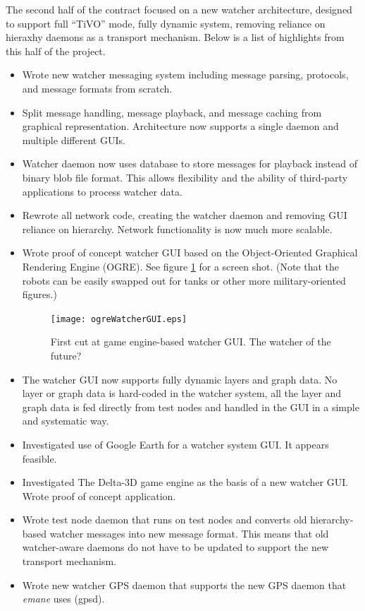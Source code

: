 \documentclass{report}
\begin{document}
The second half of the contract focused on a new watcher architecture, designed to support full ``TiVO'' mode, fully dynamic system, removing reliance
on hieraxhy daemons as a transport mechanism. Below is a list of highlights from this half of the project.

\begin{itemize}
\item Wrote new watcher messaging system including message parsing, protocols, and message formats from scratch. 
\item Split message handling, message playback, and message caching from graphical representation. Architecture now
supports a single daemon and multiple different GUIs. 
\item Watcher daemon now uses database to store messages for playback instead of binary blob file format. This allows
flexibility and the ability of third-party applications to process watcher data. 
\item Rewrote all network code, creating the watcher daemon and removing GUI reliance on hierarchy. Network functionality is now
much more scalable. 
\item Wrote proof of concept watcher GUI based on the Object-Oriented Graphical Rendering Engine (OGRE). See figure \ref{fig:ogreWatcherGUI} for a 
screen shot. (Note that the robots can be easily swapped out for tanks or other more military-oriented figures.) 

\begin{figure}[htb]
\centering
\texttt{[image: ogreWatcherGUI.eps]}
\caption{First cut at game engine-based watcher GUI. The watcher of the future?}
\label{fig:ogreWatcherGUI}
\end{figure}

\item The watcher GUI now supports fully dynamic layers and graph data. No layer or graph data is hard-coded in the watcher system, all 
the layer and graph data is fed directly from test nodes and handled in the GUI in a simple and systematic way.
\item Investigated use of Google Earth for a watcher system GUI. It appears feasible. 
\item Investigated The Delta-3D game engine as the basis of a new watcher GUI. Wrote proof of concept application. 
\item Wrote test node daemon that runs on test nodes and converts old hierarchy-based watcher messages into new message format. 
This means that old watcher-aware daemons do not have to be updated to support the new transport mechanism.
\item Wrote new watcher GPS daemon that supports the new GPS daemon that {\it emane} uses (gpsd). 
\end{itemize}
\end{document}
